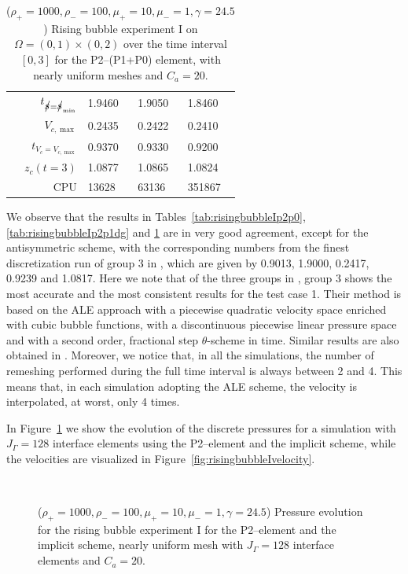 \begin{table}
\begin{tabular}{rlll}
$t_{\strikes = \strikes_{\min}}$ & 1.9460 & 1.9050 & 1.8460 \\
$V_{c,\max}$                     & 0.2435 & 0.2422 & 0.2410 \\
$t_{V_c = V_{c,\max}}$           & 0.9370 & 0.9330 & 0.9200 \\
$z_c(t=3)$                       & 1.0877 & 1.0865 & 1.0824 \\
CPU                              &  13628 &  63136 & 351867 \\
\hline
\end{tabular}
\hspace*{-3.25cm}
\caption[Navier--Stokes rising bubble I benchmark values P2--(P1+P0)]
{($\rho_+ = 1000,\rho_- = 100,\mu_+ = 10,\mu_- =1,\gamma = 24.5$)
Rising bubble experiment I on ${\Omega = (0,1) \times (0,2)}$ over the time
interval $[0,3]$ for the P2--(P1+P0) element, with nearly uniform meshes and
$C_a=20$\textdegree.}
\label{tab:risingbubbleIp2p1p0}
\end{table}
We observe that the results in Tables~\ref{tab:risingbubbleIp2p0},
\ref{tab:risingbubbleIp2p1dg} and \ref{tab:risingbubbleIp2p1p0} are in very
good agreement, except for the antisymmetric scheme, with the corresponding
numbers from the finest discretization run of group 3 in \cite{HysingTKPBGT09},
which are given by 0.9013, 1.9000, 0.2417, 0.9239 and 1.0817. Here we note that
of the three groups in \cite{HysingTKPBGT09}, group 3 shows the most accurate
and the most consistent results for the test case 1. Their method is based on
the ALE approach with a piecewise quadratic velocity space enriched with cubic
bubble functions, with a discontinuous piecewise linear pressure space and with
a second order, fractional step $\theta$-scheme in time. Similar results are
also obtained in \cite{fluidfbp}. Moreover, we notice that, in all the
simulations, the number of remeshing performed during the full time interval is
always between 2 and 4. This means that, in each simulation adopting the ALE
scheme, the velocity is interpolated, at worst, only 4 times.

In Figure~\ref{fig:risingbubbleIpressure} we show the evolution of the discrete
pressures for a simulation with $J_\Gamma=128$ interface elements using the
P2--\pdg element and the implicit scheme, while the velocities are visualized
in Figure~\ref{fig:risingbubbleIvelocity}.
\begin{figure}[htbp]
\centering
{}
\\
\caption[Navier--Stokes rising bubble I pressure]
{($\rho_+ = 1000,\rho_- = 100,\mu_+ = 10,\mu_- =1,\gamma = 24.5$)
Pressure evolution for the rising bubble experiment I for the P2--\pdg element
and the implicit scheme, nearly uniform mesh with $J_\Gamma=128$ interface
elements and $C_a=20$\textdegree.}
\label{fig:risingbubbleIpressure}
\end{figure}


